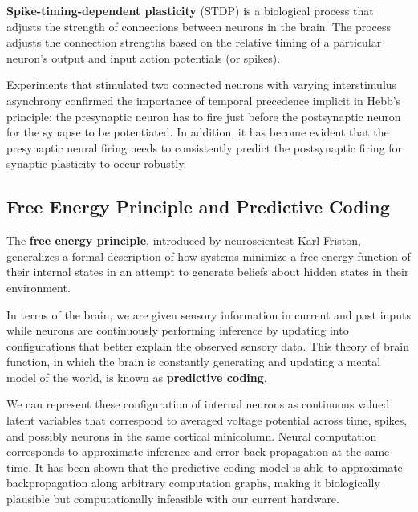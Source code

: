 \documentclass{article}
\begin{document}
\textbf{Spike-timing-dependent plasticity} (STDP) is a biological process that adjusts the strength of connections between neurons in the brain. The process adjusts the connection strengths based on the relative timing of a particular neuron's output and input action potentials (or spikes). 

Experiments that stimulated two connected neurons with varying interstimulus asynchrony confirmed the importance of temporal precedence implicit in Hebb's principle: the presynaptic neuron has to fire just before the postsynaptic neuron for the synapse to be potentiated. In addition, it has become evident that the presynaptic neural firing needs to consistently predict the postsynaptic firing for synaptic plasticity to occur robustly.


\subsection{Free Energy Principle and Predictive Coding}
The \textbf{free energy principle}, introduced by neuroscientest Karl Friston, generalizes a formal description of how systems minimize a free energy function of their internal states in an attempt to generate beliefs about hidden states in their environment.

In terms of the brain, we are given sensory information in current and past inputs while neurons are continuously performing inference by updating into configurations that better explain the observed sensory data. This theory of brain function, in which the brain is constantly generating and updating a mental model of the world, is known as \textbf{predictive coding}.

We can represent these configuration of internal neurons as continuous valued latent variables that correspond to averaged voltage potential across time, spikes, and possibly neurons in the same cortical minicolumn. Neural computation corresponds to approximate inference and error back-propagation at the same time. It has been shown that the predictive coding model is able to approximate backpropagation along arbitrary computation graphs, making it biologically plausible but computationally infeasible with our current hardware.
\end{document}
